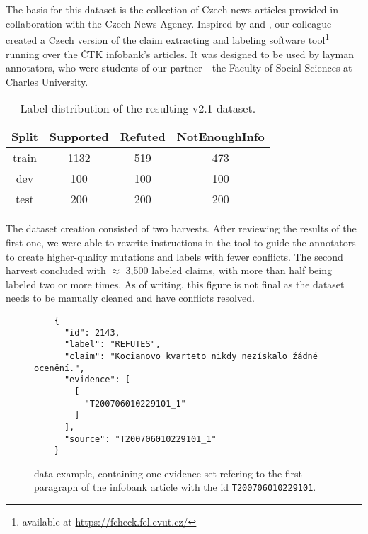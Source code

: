 \section{\CTK}

The basis for this dataset is the collection of Czech news articles provided in collaboration with the Czech News Agency. 
Inspired by \cite{fever} and \cite{danish_fever}, our colleague \cite{ullrich} created a Czech version of the claim extracting and labeling software tool\footnote{available at \url{https://fcheck.fel.cvut.cz/}} running over the ČTK infobank's articles. 
It was designed to be used by layman annotators, who were students of our partner - the Faculty of Social Sciences at Charles University.

\begin{table}[h!]
\centering
\begin{tabular}{c || c c c}
    Split & Supported & Refuted & NotEnoughInfo \\
    \hline
    train & 1132 & 519 & 473 \\
    dev & 100 & 100 & 100 \\
    test & 200 & 200 & 200
\end{tabular}
\caption[\CTK{} Dataset Label Distribution]{Label distribution of the resulting \CTK{} v2.1 dataset.}
\end{table}

The dataset creation consisted of two harvests. 
After reviewing the results of the first one, we were able to rewrite instructions in the tool to guide the annotators to create higher-quality mutations and labels with fewer conflicts.
The second harvest concluded with $\approx$ 3,500 labeled claims, with more than half being labeled two or more times. %
As of writing, this figure is not final as the dataset needs to be manually cleaned and have conflicts resolved. 

\begin{figure}[h!]
    \begin{framed}
    \begin{verbatim}
    {
      "id": 2143,
      "label": "REFUTES",
      "claim": "Kocianovo kvarteto nikdy nezískalo žádné ocenění.",
      "evidence": [
        [
          "T200706010229101_1"
        ]
      ],
      "source": "T200706010229101_1"
    }\end{verbatim}
    \vspace{-0.4cm}
    \end{framed}
    \caption[\CTK{} Dataset Example]{\CTK{} data example, containing one evidence set refering to the first paragraph of the \CTK{} infobank article with the id \texttt{T200706010229101}.}
    \label{fig:ctk_example}
\end{figure}

